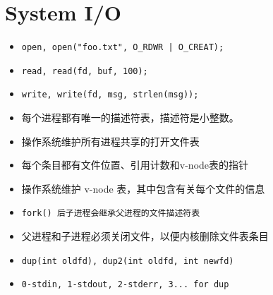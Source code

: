 \section{System I/O}
\begin{itemize}[nosep]
    \item \tt{open}, \tt{open("foo.txt", O\_RDWR | O\_CREAT);}
    \item \tt{read}, \tt{read(fd, buf, 100);}
    \item \tt{write}, \tt{write(fd, msg, strlen(msg));}
    \item 每个进程都有唯一的描述符表，描述符是小整数。
    \item 操作系统维护所有进程共享的打开文件表
    \item \quad 每个条目都有文件位置、引用计数和v-node表的指针
    \item 操作系统维护 v-node 表，其中包含有关每个文件的信息
    \item \tt{fork()} 后子进程会继承父进程的文件描述符表
    \item 父进程和子进程必须关闭文件，以便内核删除文件表条目
    \item \tt{dup(int oldfd)}, \tt{dup2(int oldfd, int newfd)}
    \item \tt{0-stdin}, \tt{1-stdout}, \tt{2-stderr}, \tt{3... for dup}
\end{itemize}
